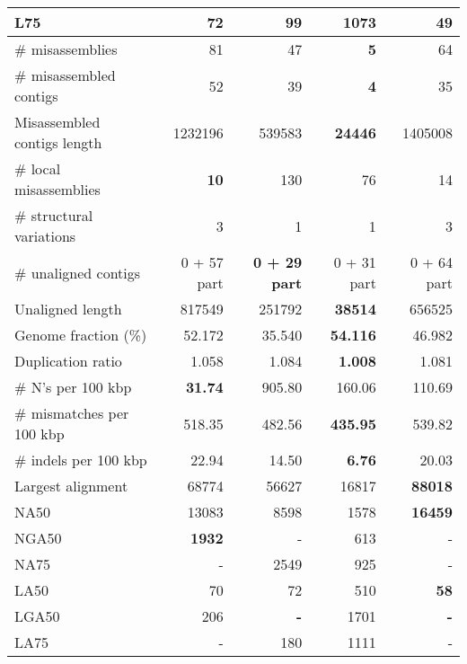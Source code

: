 \documentclass[12pt,a4paper]{article}
\begin{document}
\begin{table}[ht]
\begin{center}
\begin{tabular}{|l*{4}{|r}|}
L75 & 72 & 99 & 1073 & {\bf 49} \\ \hline
\# misassemblies & 81 & 47 & {\bf 5} & 64 \\ \hline
\# misassembled contigs & 52 & 39 & {\bf 4} & 35 \\ \hline
Misassembled contigs length & 1232196 & 539583 & {\bf 24446} & 1405008 \\ \hline
\# local misassemblies & {\bf 10} & 130 & 76 & 14 \\ \hline
\# structural variations & 3 & 1 & 1 & 3 \\ \hline
\# unaligned contigs & 0 + 57 part & {\bf 0 + 29 part} & 0 + 31 part & 0 + 64 part \\ \hline
Unaligned length & 817549 & 251792 & {\bf 38514} & 656525 \\ \hline
Genome fraction (\%) & 52.172 & 35.540 & {\bf 54.116} & 46.982 \\ \hline
Duplication ratio & 1.058 & 1.084 & {\bf 1.008} & 1.081 \\ \hline
\# N's per 100 kbp & {\bf 31.74} & 905.80 & 160.06 & 110.69 \\ \hline
\# mismatches per 100 kbp & 518.35 & 482.56 & {\bf 435.95} & 539.82 \\ \hline
\# indels per 100 kbp & 22.94 & 14.50 & {\bf 6.76} & 20.03 \\ \hline
Largest alignment & 68774 & 56627 & 16817 & {\bf 88018} \\ \hline
NA50 & 13083 & 8598 & 1578 & {\bf 16459} \\ \hline
NGA50 & {\bf 1932} & - & 613 & - \\ \hline
NA75 & - & 2549 & 925 & - \\ \hline
LA50 & 70 & 72 & 510 & {\bf 58} \\ \hline
LGA50 & 206 & {\bf -} & 1701 & {\bf -} \\ \hline
LA75 & - & 180 & 1111 & - \\ \hline
\end{tabular}
\end{center}
\end{table}
\end{document}
